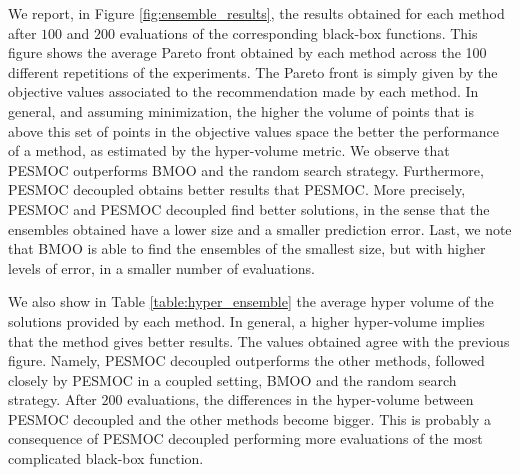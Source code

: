 We report, in Figure \ref{fig:ensemble_results}, the results obtained for each method
after $100$ and $200$ evaluations of the corresponding black-box functions. This figure shows the
average Pareto front obtained by each method across the 100 different repetitions of the experiments.
The Pareto front is simply given by the objective values associated to the recommendation made by each
method. In general, and assuming minimization, the higher the volume of points that is above this set
of points in the objective values space the better the performance of a method, as estimated by the
hyper-volume metric. We observe that PESMOC outperforms BMOO and the random search strategy. Furthermore,
PESMOC decoupled obtains better results that PESMOC. More precisely, PESMOC and PESMOC decoupled find
better solutions, in the sense that the ensembles obtained have a lower size and a smaller prediction error.
Last, we note that BMOO is able to find the ensembles of the smallest size, but with higher levels of
error, in a smaller number of evaluations.

We also show in Table \ref{table:hyper_ensemble} the average hyper volume of the solutions provided by each
method. In general, a higher hyper-volume implies that the method gives better results. The values obtained agree with
the previous figure. Namely, PESMOC decoupled outperforms the other methods, followed closely by PESMOC in a
coupled setting, BMOO and the random search strategy. After $200$ evaluations, the differences in the hyper-volume
between PESMOC decoupled and the other methods become bigger. This is probably a consequence of
PESMOC decoupled performing more evaluations of the most complicated black-box function.

